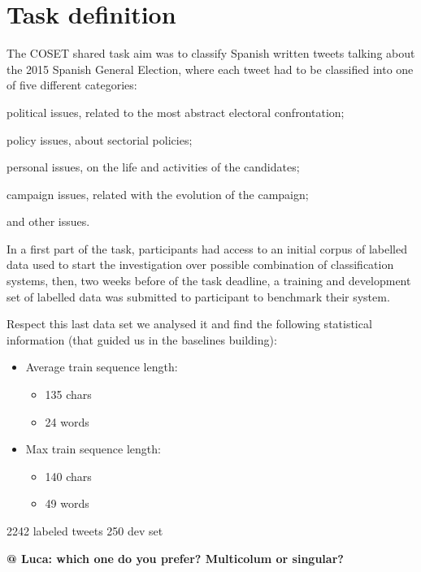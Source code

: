 \section{Task definition} \label{sec:task}

The COSET shared task aim was to classify Spanish written tweets talking about the 2015 Spanish General Election, where each tweet had to be classified into one of five different categories:
\begin{enumerate*}
\item political issues, related to the most abstract electoral confrontation; 
\item policy issues, about sectorial policies; 
\item personal issues, on the life and activities of the candidates; 
\item campaign issues, related with the evolution of the campaign;
\item and other issues.
\end{enumerate*}

In a first part of the task, participants had access to an initial corpus of labelled data used to start the investigation over possible combination of classification systems, then, two weeks before of the task deadline, a training and development set of labelled data was submitted to participant to benchmark their system.

Respect this last data set we analysed it and find the following statistical information (that guided us in the baselines building):
\begin{multicols}{2}
\begin{itemize}
	\item Average train sequence length:
	\begin{itemize}
		\item 135 chars 
		\item 24 words
	\end{itemize}
	\item Max train sequence length: 
	\begin{itemize}
		\item 140 chars
		\item 49 words
	\end{itemize}
\end{itemize}
\end{multicols}

2242 labeled tweets
250 dev set

\textbf{@ Luca: which one do you prefer? Multicolum or singular?}
